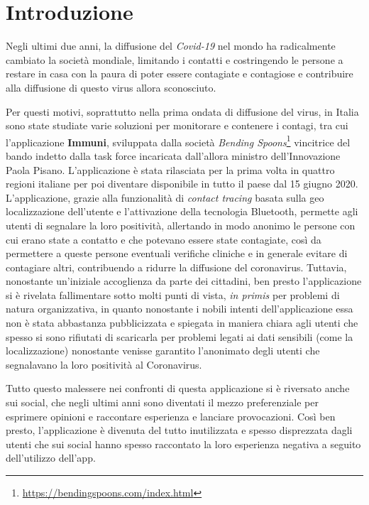 \chapter*{Introduzione}
Negli ultimi due anni, la diffusione del \textit{Covid-19} nel mondo ha radicalmente cambiato la società mondiale, limitando i contatti e costringendo le persone a restare in casa con la paura di poter essere contagiate e contagiose e contribuire alla diffusione di questo virus allora sconosciuto.

Per questi motivi, soprattutto nella prima ondata di diffusione del virus, in Italia sono state studiate varie soluzioni per monitorare e contenere i contagi, tra cui l'applicazione \textbf{Immuni}, sviluppata dalla società \textit{Bending Spoons}\footnote{\url{https://bendingspoons.com/index.html}} vincitrice del bando indetto dalla task force incaricata dall’allora ministro dell’Innovazione Paola Pisano. L'applicazione è stata rilasciata per la prima volta in quattro regioni italiane per poi diventare disponibile in tutto il paese dal 15 giugno 2020. \\
L'applicazione, grazie alla funzionalità di \textit{contact tracing} basata sulla geo localizzazione dell'utente e l'attivazione della tecnologia Bluetooth, permette agli utenti di segnalare la loro positività, allertando in modo anonimo le persone con cui erano state a contatto e che potevano essere state contagiate, così da permettere a queste persone eventuali verifiche cliniche e in generale evitare di contagiare altri, contribuendo a ridurre la diffusione del coronavirus. %
Tuttavia, nonostante un'iniziale accoglienza da parte dei cittadini, ben presto l'applicazione si è rivelata fallimentare sotto molti punti di vista, \textit{in primis} per problemi di natura organizzativa, in quanto nonostante i nobili intenti dell'applicazione essa non è stata abbastanza pubblicizzata e spiegata in maniera chiara agli utenti che spesso si sono rifiutati di scaricarla per problemi legati ai dati sensibili (come la localizzazione) %
nonostante venisse garantito l'anonimato degli utenti che segnalavano la loro positività al Coronavirus.

Tutto questo malessere nei confronti di questa applicazione si è riversato anche sui social, che negli ultimi anni sono diventati il mezzo preferenziale per esprimere opinioni e raccontare esperienza e lanciare provocazioni. Così ben presto, l'applicazione è divenuta del tutto inutilizzata e spesso disprezzata dagli utenti che sui social hanno spesso raccontato la loro esperienza negativa a seguito dell'utilizzo dell'app.\\

